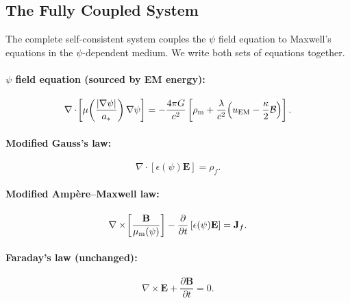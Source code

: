 \documentclass[aps,prd,twocolumn,superscriptaddress,floatfix,nofootinbib]{revtex4-2}
\newcommand{\astar}{a_*}
\newcommand{\mufunction}{\mu}
\newcommand{\lam}{\lambda}
\newcommand{\kap}{\kappa}
\newcommand{\calB}{\mathcal{B}}
\begin{document}
\subsection{The Fully Coupled System}
\label{sec:coupled-system}

The complete self-consistent system couples the $\psi$ field equation
to Maxwell's equations in the $\psi$-dependent medium. We write both
sets of equations together.

\paragraph{$\psi$ field equation (sourced by EM energy):}
\begin{equation}
\nabla\cdot\!\left[\mufunction\!\left(
\frac{|\nabla\psi|}{\astar}\right)\nabla\psi\right]
= -\frac{4\pi G}{c^2}\left[
  \rho_{\rm m} + \frac{\lam}{c^2}\!\left(u_{\rm EM}
  - \frac{\kap}{2}\calB\right)\right].
\label{eq:coupled-psi}
\end{equation}

\paragraph{Modified Gauss's law:}
\begin{equation}
\nabla\cdot\!\left[\epsilon(\psi)\mathbf{E}\right] = \rho_f.
\label{eq:coupled-gauss}
\end{equation}

\paragraph{Modified Amp\`{e}re--Maxwell law:}
\begin{equation}
\nabla\times\!\left[\frac{\mathbf{B}}{\mu_{\rm m}(\psi)}\right]
- \frac{\partial}{\partial t}\left[\epsilon(\psi)\mathbf{E}\right]
= \mathbf{J}_f.
\label{eq:coupled-ampere}
\end{equation}

\paragraph{Faraday's law (unchanged):}
\begin{equation}
\nabla\times\mathbf{E} + \frac{\partial\mathbf{B}}{\partial t} = 0.
\label{eq:coupled-faraday}
\end{equation}
\end{document}
